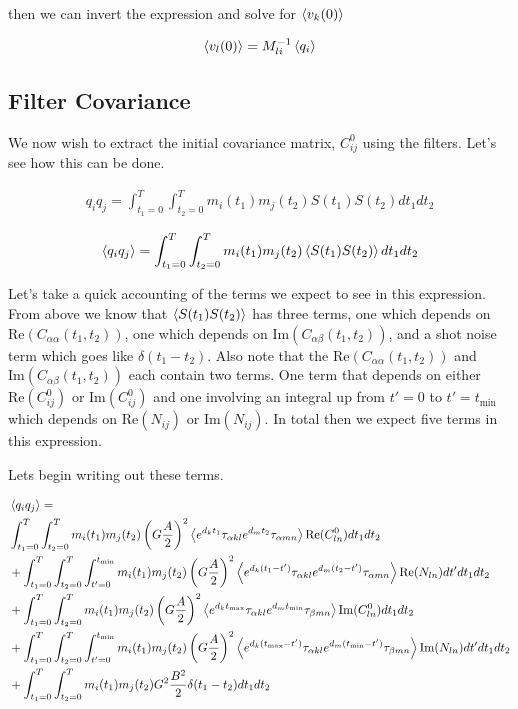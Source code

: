 \documentclass[12pt]{article}
\begin{document}
then we can invert the expression and solve for $\Braket{v_k(0)}$

\begin{align}
\Braket{v_{l}(0)} = M^{-1}_{li}\Braket{q_i}
\end{align}

\subsection{Filter Covariance}
We now wish to extract the initial covariance matrix, $C^0_{ij}$ using the filters. Let's see how this can be done.

\begin{align}
q_i q_j = \int_{t_1=0}^T\int_{t_2=0}^T m_i(t_1)m_j(t_2) S(t_1)S(t_2) dt_1 dt_2
\end{align}

\begin{align}
\Braket{q_i q_j} = \int_{t_1=0}^T\int_{t_2=0}^T m_i(t_1)m_j(t_2) \Braket{S(t_1)S(t_2)} dt_1 dt_2
\end{align}

Let's take a quick accounting of the terms we expect to see in this expression. From above we know that $\Braket{S(t_1)S(t_2)}$ has three terms, one which depends on $\text{Re}(C_{\alpha\alpha}(t_1,t_2))$, one which depends on $\text{Im}(C_{\alpha\beta}(t_1,t_2))$, and a shot noise term which goes like $\delta(t_1-t_2)$. Also note that the $\text{Re}(C_{\alpha\alpha}(t_1,t_2))$ and $\text{Im}(C_{\alpha\beta}(t_1,t_2))$ each contain two terms. One term that depends on either $\text{Re}(C^0_{ij})$ or $\text{Im}(C^0_{ij})$ and one involving an integral up from $t'=0$ to $t'=t_{\text{min}}$ which depends on $\text{Re}(N_{ij})$ or $\text{Im}(N_{ij})$. In total then we expect five terms in this expression.

Lets begin writing out these terms.

\begin{align}
&\Braket{q_iq_j} =\\
&\int_{t_1=0}^{T}\int_{t_2=0}^T m_i(t_1)m_j(t_2) \left(G\frac{A}{2}\right)^2 \Braket{e^{d_k t_1}\tau_{\alpha kl} e^{d_m t_2} \tau_{\alpha mn}} \text{Re}(C^0_{ln}) dt_1 dt_2\\
&+\int_{t_1=0}^{T}\int_{t_2=0}^T\int_{t'=0}^{t_{\text{min}}} m_i(t_1)m_j(t_2) \left(G\frac{A}{2}\right)^2 \Braket{e^{d_k (t_1-t')}\tau_{\alpha kl} e^{d_m (t_2-t')} \tau_{\alpha mn}} \text{Re}(N_{ln}) dt' dt_1 dt_2\\
&+\int_{t_1=0}^{T}\int_{t_2=0}^T m_i(t_1)m_j(t_2) \left(G\frac{A}{2}\right)^2 \Braket{e^{d_k t_{\text{max}}}\tau_{\alpha kl} e^{d_m t_{\text{min}}} \tau_{\beta mn}} \text{Im}(C^0_{ln}) dt_1 dt_2\\
&+\int_{t_1=0}^{T}\int_{t_2=0}^T\int_{t'=0}^{t_{\text{min}}} m_i(t_1)m_j(t_2) \left(G\frac{A}{2}\right)^2 \Braket{e^{d_k (t_{\text{max}}-t')}\tau_{\alpha kl} e^{d_m (t_{\text{min}}-t')} \tau_{\beta mn}} \text{Im}(N_{ln}) dt' dt_1 dt_2\\
&+\int_{t_1=0}^T\int_{t_2=0}^T m_i(t_1)m_j(t_2) G^2\frac{B^2}{2}\delta(t_1-t_2) dt_1 dt_2
\end{align}
\end{document}
